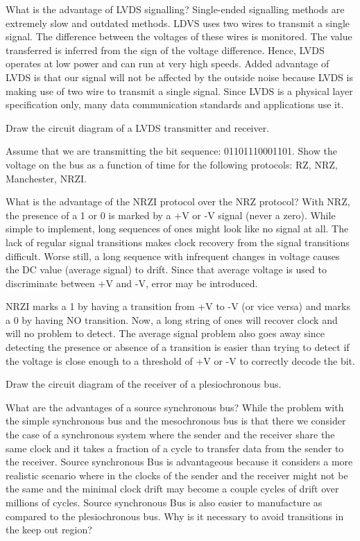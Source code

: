 \begin{ExerciseList}
\Exercise
What is the advantage of LVDS signalling?
\Answer
Single-ended signalling methods are extremely slow and outdated methods.
LDVS uses two wires to transmit a single signal. The difference between the voltages of these wires is monitored. 
The value transferred is inferred from the sign of the voltage difference. Hence, LVDS operates at low power and can run at very high speeds. Added advantage of LVDS is that our signal will not be affected by the outside noise because LVDS is making use of two wire to transmit a single signal.
Since LVDS is a physical layer specification only, many data communication standards and applications use it.

\Exercise
Draw the circuit diagram of a LVDS transmitter and receiver.

\Exercise
Assume that we are transmitting the bit sequence: 01101110001101.
Show the voltage on the bus as a function of time for the following protocols:
RZ, NRZ, Manchester, NRZI. 

\Exercise
What is the advantage of the NRZI protocol over the NRZ protocol?
\Answer
With NRZ, the presence of a 1 or 0 is marked by a +V or -V signal (never a zero).  While simple to implement, long sequences of ones might look like no signal at all.  The lack of regular signal transitions makes clock recovery from the signal transitions difficult.  Worse still, a long sequence with infrequent changes in voltage causes the DC value (average signal) to drift.  Since that average voltage is used to discriminate between +V and -V, error may be introduced.

NRZI marks a 1 by having a transition from +V to -V (or vice versa) and marks a 0 by having NO transition.  Now, a long string of ones  will recover clock and will  no problem to detect. The average signal problem also goes away since detecting the presence or absence of a transition is easier than trying to detect if the voltage is close enough to a threshold of +V or -V to correctly decode the bit.

\Exercise
Draw the circuit diagram of the receiver of a plesiochronous bus.

\Exercise
What are the advantages of a source synchronous bus?
\Answer
While the problem with the simple synchronous bus and the mesochronous bus is that there we consider the case of a synchronous system where the sender and the receiver share the same clock and it takes a fraction of a cycle to transfer data from the sender to the receiver.
Source synchronous Bus is advantageous because it considers a more realistic scenario where in the clocks of the sender and the receiver might not be the same and the minimal clock drift may become a couple cycles of drift over millions  of cycles.
Source synchronous Bus is also easier to manufacture as compared to the plesiochronous bus. 
\Exercise
Why is it necessary to avoid transitions in the keep out region?


\end{ExerciseList}
